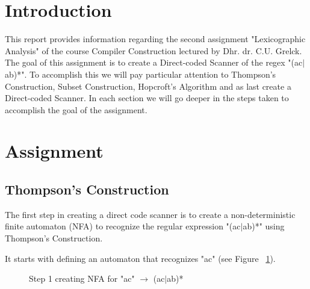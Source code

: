 \documentclass{uva-inf-article}
\begin{document}
\section{Introduction}
\begin{flushleft}
\par This report provides information regarding the second assignment 
     "Lexicographic Analysis" of the course Compiler Construction lectured by Dhr. dr. C.U. Grelck. 
     The goal of this assignment is to create a Direct-coded Scanner of the regex "(ac$\mid$ab)*". To accomplish this we will pay particular attention to 
     Thompson’s Construction, Subset Construction, Hopcroft’s Algorithm and as last create a Direct-coded Scanner. In each section we will go deeper 
     in the steps taken to accomplish the goal of the assignment.


\newpage
\section{Assignment}

\subsection{Thompson’s Construction}

    \par The first step in creating a direct code scanner is to create a 
         non-deterministic finite automaton (NFA) to recognize the regular expression
         "(ac$\mid$ab)*" using Thompson's Construction.

    \par It starts with defining an automaton that recognizes "ac" (see Figure ~\ref{fig:ThCoStep1}).

    \begin{figure}[h]
        \centering
        \caption{Step 1 creating NFA for "ac" $\rightarrow$ (ac$\mid$ab)*}
        \label{fig:ThCoStep1}
    \end{figure}


\end{flushleft}
\end{document}
